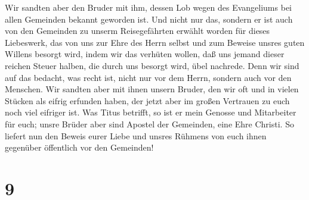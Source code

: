  Wir sandten aber den Bruder mit ihm, dessen Lob wegen
des Evangeliums bei allen Gemeinden bekannt geworden ist.
 Und nicht nur das, sondern er ist auch von den Gemeinden
zu unserm Reisegefährten erwählt worden für dieses Liebeswerk, das von
uns zur Ehre des Herrn selbst und zum Beweise unsres guten Willens
besorgt wird,  indem wir das verhüten wollen, daß uns
jemand dieser reichen Steuer halben, die durch uns besorgt wird, übel
nachrede.  Denn wir sind auf das bedacht, was recht ist,
nicht nur vor dem Herrn, sondern auch vor den Menschen. 
Wir sandten aber mit ihnen unsern Bruder, den wir oft und in vielen
Stücken als eifrig erfunden haben, der jetzt aber im großen Vertrauen zu
euch noch viel eifriger ist.  Was Titus betrifft, so ist
er mein Genosse und Mitarbeiter für euch; unsre Brüder aber sind Apostel
der Gemeinden, eine Ehre Christi.  So liefert nun den
Beweis eurer Liebe und unsres Rühmens von euch ihnen gegenüber
öffentlich vor den Gemeinden!

\hypertarget{section-8}{%
\section{9}\label{section-8}}

